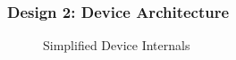 \begin{frame}
\frametitle{Design 2: Device Architecture}

\begin{figure}
\centering
{
\scalebox{0.55}{}
}
\caption*{Simplified Device Internals}
\end{figure}

\end{frame}

